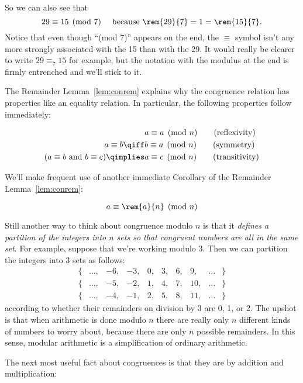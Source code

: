 So we can also see that
\[
29 \equiv 15 \pmod{7} \quad\text{ because } \rem{29}{7} = 1 = \rem{15}{7}.
\]
Notice that even though ``(mod 7)'' appears on the end, the
$\equiv$ symbol isn't any more strongly associated with the 15
than with the 29.  It would really be clearer to write $29
\equiv_7 15$ for example, but the notation with the modulus at
the end is firmly entrenched and we'll stick to it.

The Remainder Lemma~\ref{lem:conrem} explains why the congruence
relation has properties like an equality relation.  In particular, the
following properties follow immediately:
\begin{lemma}\label{mod_equiv_rel_lem} \mbox{}
\begin{align}
                  & a \equiv a \pmod{n}\tag{reflexivity}\\
a \equiv b  \qiff & b \equiv a \pmod{n} \tag{symmetry}\\
(a \equiv b \text{ and }  b \equiv c) \qimplies & a \equiv c \pmod{n}
\tag{transitivity}
\end{align}
\end{lemma}


We'll make frequent use of another immediate Corollary of
the Remainder Lemma~\ref{lem:conrem}:
\begin{corollary}\label{aran}
\[
a \equiv \rem{a}{n} \pmod{n}
\]
\end{corollary}

Still another way to think about congruence modulo $n$ is that it
\emph{defines a partition of the integers into $n$ sets so that congruent
numbers are all in the same set}.  For example, suppose that we're working
modulo 3.  Then we can partition the integers into 3 sets as follows:
%
\[
\begin{array}{cccccccccc}
\{ & \dots, & -6, & -3, & 0, & 3, & 6, & 9, & \dots & \} \\
\{ & \dots, & -5, & -2, & 1, & 4, & 7, & 10, & \dots & \} \\
\{ & \dots, & -4, & -1, & 2, & 5, & 8, & 11, & \dots & \}
\end{array}
\]
according to whether their remainders on division by 3 are 0, 1, or 2.
The upshot is that when arithmetic is done modulo $n$ there are really
only $n$ different kinds of numbers to worry about, because there are only
$n$ possible remainders.  In this sense, modular arithmetic is a
simplification of ordinary arithmetic.\iffalse
 and thus is a good reasoning tool.\fi


The next most useful fact about congruences is that they are
 by addition and multiplication:

